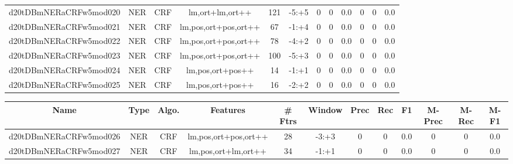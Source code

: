 \documentclass[a4paper]{article}
\begin{document}
\begin{landscape}
\begin{center}
\begin{tabular}{ |c|c|c|c|c|c|c|c|c|c|c|c|}
 
 	
 	\small{ d20tDBmNERaCRFw5mod020 } & \small{ NER} & \small{  CRF }  & lm,ort+lm,ort++  &  121 &  \small{  -5:+5 }  &  0 & 0 & 0.0  &  0 & 0 & 0.0 \\
 	

 
 	
 	\small{ d20tDBmNERaCRFw5mod021 } & \small{ NER} & \small{  CRF }  & lm,pos,ort+pos,ort++  &  67 &  \small{  -1:+4 }  &  0 & 0 & 0.0  &  0 & 0 & 0.0 \\
 	

 
 	
 	\small{ d20tDBmNERaCRFw5mod022 } & \small{ NER} & \small{  CRF }  & lm,pos,ort+pos,ort++  &  78 &  \small{  -4:+2 }  &  0 & 0 & 0.0  &  0 & 0 & 0.0 \\
 	

 
 	
 	\small{ d20tDBmNERaCRFw5mod023 } & \small{ NER} & \small{  CRF }  & lm,pos,ort+pos,ort++  &  100 &  \small{  -5:+3 }  &  0 & 0 & 0.0  &  0 & 0 & 0.0 \\
 	

 
 	
 	\small{ d20tDBmNERaCRFw5mod024 } & \small{ NER} & \small{  CRF }  & lm,pos,ort+pos++  &  14 &  \small{  -1:+1 }  &  0 & 0 & 0.0  &  0 & 0 & 0.0 \\
 	

 
 	
 	\small{ d20tDBmNERaCRFw5mod025 } & \small{ NER} & \small{  CRF }  & lm,pos,ort+pos++  &  16 &  \small{  -2:+2 }  &  0 & 0 & 0.0  &  0 & 0 & 0.0 \\
 	
 \hline
\end{tabular}
\end{center}




\begin{center}
\begin{tabular}{ |c|c|c|c|c|c|c|c|c|c|c|c|} 
 \hline
 	Name & Type & Algo. & Features & \# Ftrs & Window & Prec & Rec & F1 & M-Prec & M-Rec & M-F1\\
 \hline

 	

 
 	
 	\small{ d20tDBmNERaCRFw5mod026 } & \small{ NER} & \small{  CRF }  & lm,pos,ort+pos,ort++  &  28 &  \small{  -3:+3 }  &  0 & 0 & 0.0  &  0 & 0 & 0.0 \\
 	

 
 	
 	\small{ d20tDBmNERaCRFw5mod027 } & \small{ NER} & \small{  CRF }  & lm,pos,ort+lm,ort++  &  34 &  \small{  -1:+1 }  &  0 & 0 & 0.0  &  0 & 0 & 0.0 \\
 	


\end{tabular}
\end{center}
\end{landscape}
\end{document}
